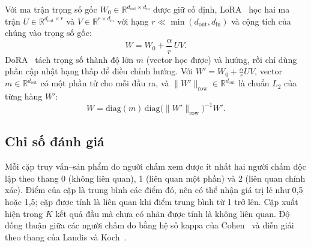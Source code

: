 Với ma trận trọng số gốc $W_0\in\mathbb{R}^{d_{\mathrm{out}}\times d_{\mathrm{in}}}$ được giữ cố định, LoRA~\cite{hu2022lora} học hai ma trận $U\in\mathbb{R}^{d_{\mathrm{out}}\times r}$ và $V\in\mathbb{R}^{r\times d_{\mathrm{in}}}$ với hạng $r\ll\min(d_{\mathrm{out}},d_{\mathrm{in}})$ và cộng tích của chúng vào trọng số gốc:
\begin{equation}
W=W_0+\frac{\alpha}{r}\,UV.
\label{eq:lora}
\end{equation}
DoRA~\cite{liu2024dora} tách trọng số thành độ lớn $m$ (vector học được) và hướng, rồi chỉ dùng phần cập nhật hạng thấp để điều chỉnh hướng. Với $W'=W_0+\frac{\alpha}{r}UV$, vector $m\in\mathbb{R}^{d_{\mathrm{out}}}$ có một phần tử cho mỗi đầu ra, và $\lVert W'\rVert_{\mathrm{row}}\in\mathbb{R}^{d_{\mathrm{out}}}$ là chuẩn $L_2$ của từng hàng $W'$:
\begin{equation}
W=\mathrm{diag}(m)\,\mathrm{diag}\bigl(\lVert W'\rVert_{\mathrm{row}}\bigr)^{-1}W'.
\label{eq:dora}
\end{equation}

\subsection{Chỉ số đánh giá}
\label{sec:chi-so-danh-gia}

Mỗi cặp truy vấn--sản phẩm do người chấm xem được ít nhất hai người chấm độc lập theo thang 0 (không liên quan), 1 (liên quan một phần) và 2 (liên quan chính xác). Điểm của cặp là trung bình các điểm đó, nên có thể nhận giá trị lẻ như 0,5 hoặc 1,5; cặp được tính là liên quan khi điểm trung bình từ 1 trở lên. Cặp xuất hiện trong $K$ kết quả đầu mà chưa có nhãn được tính là không liên quan. Độ đồng thuận giữa các người chấm đo bằng hệ số kappa của Cohen~\cite{cohen1960kappa} và diễn giải theo thang của Landis và Koch~\cite{landis1977kappa}.

